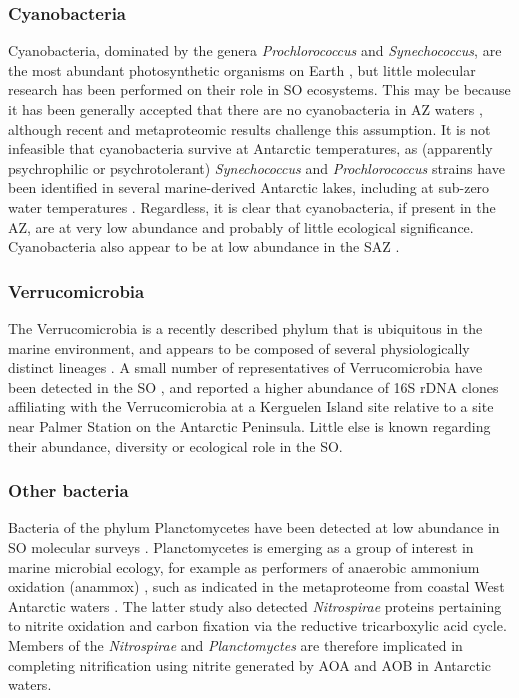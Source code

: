 \subsubsection{Cyanobacteria}

Cyanobacteria, dominated by the genera \emph{Prochlorococcus} and \emph{Synechococcus}, are the most abundant photosynthetic organisms on Earth \citep[][and references therein]{Scanlan:2009cw}, but little molecular research has been performed on their role in \ac{SO} ecosystems.
This may be because it has been generally accepted that there are no cyanobacteria in \ac{AZ} waters \cite{Ghiglione:2011ee,Zubkov:1998uf,Evans:2011ih}, although recent and metaproteomic results \cite{Williams:2012bs} challenge this assumption.
It is not infeasible that cyanobacteria survive at Antarctic temperatures, as (apparently psychrophilic or psychrotolerant) \emph{Synechococcus} and \emph{Prochlorococcus} strains have been identified in several marine-derived Antarctic lakes, including at sub-zero water temperatures \cite{Bowman:2000ef,Powell:2005uh,Lauro:2010jna}.
Regardless, it is clear that cyanobacteria, if present in the \ac{AZ}, are at very low abundance and probably of little ecological significance.
Cyanobacteria also appear to be at low abundance in the \ac{SAZ} \cite{Abell:2005ji,Topping:2006ul}.  

\subsubsection{Verrucomicrobia}

The Verrucomicrobia is a recently described phylum that is ubiquitous in the marine environment, and appears to be composed of several physiologically distinct lineages \cite{Freitas:2012jz}.
A small number of representatives of Verrucomicrobia have been detected in the \ac{SO} \cite{Murray:2011ib,West:2008kc,Gentile:2006ef,Murray:2007db}, and \citet{Ghiglione:2011ee} reported a higher abundance of 16S rDNA clones affiliating with the Verrucomicrobia at a Kerguelen Island site relative to a site near Palmer Station on the Antarctic Peninsula.
Little else is known regarding their abundance, diversity or ecological role in the \ac{SO}.

\subsubsection{Other bacteria}

Bacteria of the phylum Planctomycetes have been detected at low abundance in \ac{SO} molecular surveys \cite{Gentile:2006ef,LopezGarcia:2001vp,Jamieson:2012up,Murray:2011ib,Abell:2005ji}.
Planctomycetes is emerging as a group of interest in marine microbial ecology, for example as performers of anaerobic ammonium oxidation (anammox) \cite{Strous:1999wj}, such as indicated in the metaproteome from coastal West Antarctic waters \cite{Williams:2012bs}.
The latter study also detected \emph{Nitrospirae} proteins pertaining to nitrite oxidation and carbon fixation via the reductive tricarboxylic acid cycle.
Members of the \emph{Nitrospirae} and \emph{Planctomyctes} are therefore implicated in completing nitrification using nitrite generated by AOA and AOB in Antarctic waters.

